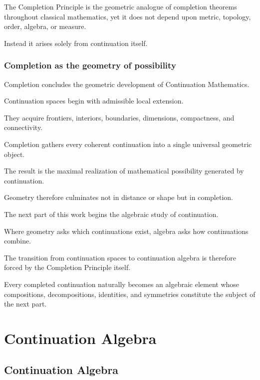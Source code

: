 \documentclass[13pt,openany]{book}
\theoremstyle{plain}
\theoremstyle{definition}
\begin{document}
The Completion Principle is the geometric analogue of completion theorems
throughout classical mathematics, yet it does not depend upon metric,
topology, order, algebra, or measure.

Instead it arises solely from continuation itself.

\section{Completion as the geometry of possibility}

Completion concludes the geometric development of Continuation Mathematics.

Continuation spaces begin with admissible local extension.

They acquire frontiers, interiors, boundaries, dimensions, compactness,
and connectivity.

Completion gathers every coherent continuation into a single universal
geometric object.

The result is the maximal realization of mathematical possibility generated by
continuation.

Geometry therefore culminates not in distance or shape but in completion.

The next part of this work begins the algebraic study of continuation.

Where geometry asks which continuations exist, algebra asks how
continuations combine.

The transition from continuation spaces to continuation algebra is therefore
forced by the Completion Principle itself.

Every completed continuation naturally becomes an algebraic element whose
compositions, decompositions, identities, and symmetries constitute the
subject of the next part.

\part{Continuation Algebra}

\chapter{Continuation Algebra}
\end{document}
